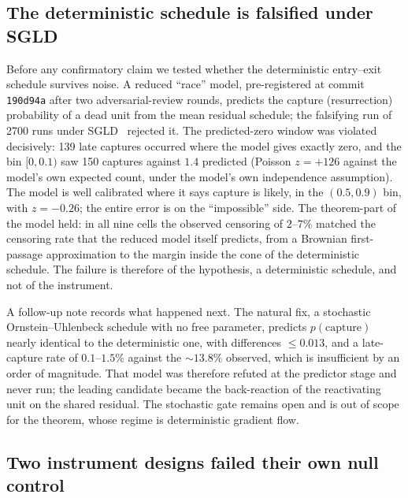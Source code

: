 \documentclass[11pt]{article}
\theoremstyle{definition}
\theoremstyle{remark}
\begin{document}
\subsection{The deterministic schedule is falsified under SGLD}\label{sec:falsification}

Before any confirmatory claim we tested whether the deterministic entry--exit
schedule survives noise. A reduced ``race'' model, pre-registered at commit
\texttt{190d94a} after two adversarial-review rounds, predicts the capture
(resurrection) probability of a dead unit from the mean residual schedule; the
falsifying run of 2700 runs under SGLD~\cite{WT11} rejected it. The
predicted-zero window was violated decisively: 139 late captures occurred where
the model gives exactly zero, and the bin $[0,0.1)$ saw 150 captures against
$1.4$ predicted (Poisson $z=+126$ against the model's own expected count, under
the model's own independence assumption). The model is well calibrated where it
says capture is likely, in the $(0.5,0.9)$ bin, with $z=-0.26$; the entire error
is on the ``impossible'' side. The theorem-part of the model held: in all nine
cells the observed censoring of $2$--$7\%$ matched the censoring rate that the
reduced model itself predicts, from a Brownian first-passage approximation to the
margin inside the cone of the deterministic schedule. The failure is therefore of
the hypothesis, a deterministic schedule, and not of the instrument.

A follow-up note records what happened next. The natural fix, a stochastic
Ornstein--Uhlenbeck schedule with no free parameter, predicts $p(\mathrm{capture})$
nearly identical to the deterministic one, with differences $\le0.013$, and a
late-capture rate of $0.1$--$1.5\%$ against the $\sim13.8\%$ observed, which is
insufficient by an order of magnitude. That model was therefore refuted at the
predictor stage and never run; the leading candidate became the back-reaction of
the reactivating unit on the shared residual. The stochastic gate remains open
and is out of scope for the theorem, whose regime is deterministic gradient flow.

\subsection{Two instrument designs failed their own null control}\label{sec:negatives}
\end{document}
